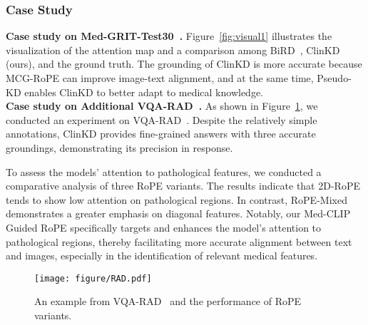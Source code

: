 \subsubsection{Case Study}
\textbf{Case study on Med-GRIT-Test30~\cite{ye2023samed2d20m, cheng2023sammed2d}.}
Figure~\ref{fig:visual1} illustrates the visualization of the attention map and a comparison among BiRD~\cite{huang2024BiRD}, ClinKD (ours), and the ground truth. The grounding of ClinKD is more accurate because MCG-RoPE can improve image-text alignment, and at the same time, Pseudo-KD enables ClinKD to better adapt to medical knowledge.\\
\textbf{Case study on Additional VQA-RAD~\cite{lau2018dataset}.}
As shown in Figure~\ref{fig:rad}, we conducted an experiment on VQA-RAD~\cite{lau2018dataset}. Despite the relatively simple annotations, ClinKD provides fine-grained answers with three accurate groundings, demonstrating its precision in response.

To assess the models' attention to pathological features, we conducted a comparative analysis of three RoPE variants. The results indicate that 2D-RoPE~\cite{su2023roformerenhancedtransformerrotary} tends to show low attention on pathological regions. In contrast, RoPE-Mixed~\cite{heo2024rotarypositionembeddingvision} demonstrates a greater emphasis on diagonal features. Notably, our Med-CLIP Guided RoPE specifically targets and enhances the model's attention to pathological regions, thereby facilitating more accurate alignment between text and images, especially in the identification of relevant medical features.
\begin{figure}[t]
    \centering
    \begin{center}
    \texttt{[image: figure/RAD.pdf]}
    \end{center}
    \vspace{-2em}
    \caption{An example from VQA-RAD~\cite{lau2018dataset} and the performance of RoPE variants.}
    \label{fig:rad}
    \vspace{-1em}
\end{figure}
